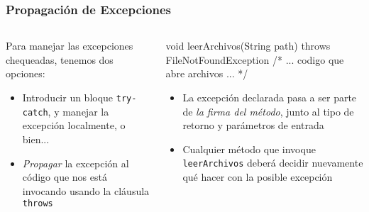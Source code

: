 \documentclass{beamer}
\newcommand{\code}[1]{\texttt{#1}}
\newcommand{\codet}[1]{\texttt{#1}}
\begin{document}
\begin{frame}[fragile]
  \frametitle{Propagación de Excepciones}

  \begin{columns}
    \begin{column}{0.4\textwidth}
     \begin{small}
       Para manejar las excepciones chequeadas, tenemos dos opciones:
  \begin{itemize}

  \item Introducir un bloque \codet{try-catch}, y manejar la excepción
    localmente, o bien...
    
  \item \emph{Propagar} la excepción al código que nos está
    invocando usando la cláusula \code{throws}
  \end{itemize}
      \end{small}      
    \end{column}
    \begin{column}{0.6\textwidth}
\begin{jsmall}
  void leerArchivos(String path)
       throws FileNotFoundException {
    /* ... codigo que abre archivos ... */
  }
\end{jsmall}
      \begin{small}
      \begin{itemize}

      \item La excepción declarada pasa a ser parte de \emph{la firma
          del método}, junto al tipo de retorno y parámetros de
        entrada
      
      \item Cualquier método que invoque \code{leerArchivos} deberá
        decidir nuevamente qué hacer con la posible excepción

      \end{itemize}
      \end{small}
      
    \end{column}
  \end{columns}  
\end{frame}




\end{document}
